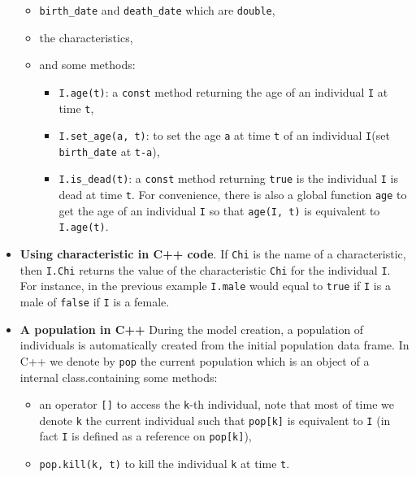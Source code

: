 \begin{itemize}
  \begin{itemize}
  \tightlist
  \item
    \texttt{birth\_date} and \texttt{death\_date} which are \texttt{double},
  \item
    the characteristics,
  \item
    and some methods:

    \begin{itemize}
    \tightlist
    \item
      \texttt{I.age(t)}: a \texttt{const} method returning the age of an individual \texttt{I} at time \texttt{t},
    \item
      \texttt{I.set\_age(a,\ t)}: to set the age \texttt{a} at time \texttt{t} of an individual \texttt{I}(set \texttt{birth\_date} at \texttt{t-a}),
    \item
      \texttt{I.is\_dead(t)}: a \texttt{const} method returning \texttt{true} is the individual \texttt{I} is dead at time \texttt{t}.
      For convenience, there is also a global function \texttt{age} to get the age of an individual \texttt{I} so that \texttt{age(I,\ t)} is equivalent to \texttt{I.age(t)}.
    \end{itemize}
  \end{itemize}
\item
  \textbf{Using characteristic in C++ code}.
  If \texttt{Chi} is the name of a characteristic, then \texttt{I.Chi} returns the value of the characteristic \texttt{Chi} for the individual \texttt{I}. For instance, in the previous example \texttt{I.male} would equal to \texttt{true} if \texttt{I} is a male of \texttt{false} if \texttt{I} is a female.
\item
  \textbf{A population in C++}
  During the model creation, a population of individuals is automatically created from the initial population data frame. In C++ we denote by \texttt{pop} the current population which is an object of a internal class.containing some methods:

  \begin{itemize}
  \tightlist
  \item
    an operator \texttt{{[}{]}} to access the \texttt{k}-th individual, note that most of time we denote \texttt{k} the current individual such that \texttt{pop{[}k{]}} is equivalent to \texttt{I} (in fact \texttt{I} is defined as a reference on \texttt{pop{[}k{]}}),
  \item
    \texttt{pop.kill(k,\ t)} to kill the individual \texttt{k} at time \texttt{t}.
  \end{itemize}
\end{itemize}

